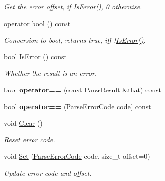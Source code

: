 \begin{DoxyCompactItemize}
\begin{DoxyCompactList}\small\item\em Get the error offset, if \hyperlink{struct_parse_result_a07c35a6769f5cb8a73cbc56c41e60a2a}{Is\+Error()}, 0 otherwise. \end{DoxyCompactList}\item 
\hyperlink{struct_parse_result_a74ab79dfa41d390002d1ea188a749bce}{operator bool} () const \hypertarget{struct_parse_result_a74ab79dfa41d390002d1ea188a749bce}{}\label{struct_parse_result_a74ab79dfa41d390002d1ea188a749bce}

\begin{DoxyCompactList}\small\item\em Conversion to {\ttfamily bool}, returns {\ttfamily true}, iff !\hyperlink{struct_parse_result_a07c35a6769f5cb8a73cbc56c41e60a2a}{Is\+Error()}. \end{DoxyCompactList}\item 
bool \hyperlink{struct_parse_result_a07c35a6769f5cb8a73cbc56c41e60a2a}{Is\+Error} () const \hypertarget{struct_parse_result_a07c35a6769f5cb8a73cbc56c41e60a2a}{}\label{struct_parse_result_a07c35a6769f5cb8a73cbc56c41e60a2a}

\begin{DoxyCompactList}\small\item\em Whether the result is an error. \end{DoxyCompactList}\item 
bool {\bfseries operator==} (const \hyperlink{struct_parse_result}{Parse\+Result} \&that) const \hypertarget{struct_parse_result_a90794619408c295ffa923f3307526bed}{}\label{struct_parse_result_a90794619408c295ffa923f3307526bed}

\item 
bool {\bfseries operator==} (\hyperlink{group___r_a_p_i_d_j_s_o_n___e_r_r_o_r_s_ga8d4b32dfc45840bca189ade2bbcb6ba7}{Parse\+Error\+Code} code) const \hypertarget{struct_parse_result_a5a0bd70f5bbb383ac63a6450ac4ae4d1}{}\label{struct_parse_result_a5a0bd70f5bbb383ac63a6450ac4ae4d1}

\item 
void \hyperlink{struct_parse_result_a88b6d44f052a19e6436ae6aadc2c40b4}{Clear} ()\hypertarget{struct_parse_result_a88b6d44f052a19e6436ae6aadc2c40b4}{}\label{struct_parse_result_a88b6d44f052a19e6436ae6aadc2c40b4}

\begin{DoxyCompactList}\small\item\em Reset error code. \end{DoxyCompactList}\item 
void \hyperlink{struct_parse_result_aa81b4a7b776b77216cb752385203a8c1}{Set} (\hyperlink{group___r_a_p_i_d_j_s_o_n___e_r_r_o_r_s_ga8d4b32dfc45840bca189ade2bbcb6ba7}{Parse\+Error\+Code} code, size\+\_\+t offset=0)\hypertarget{struct_parse_result_aa81b4a7b776b77216cb752385203a8c1}{}\label{struct_parse_result_aa81b4a7b776b77216cb752385203a8c1}

\begin{DoxyCompactList}\small\item\em Update error code and offset. \end{DoxyCompactList}\end{DoxyCompactItemize}
